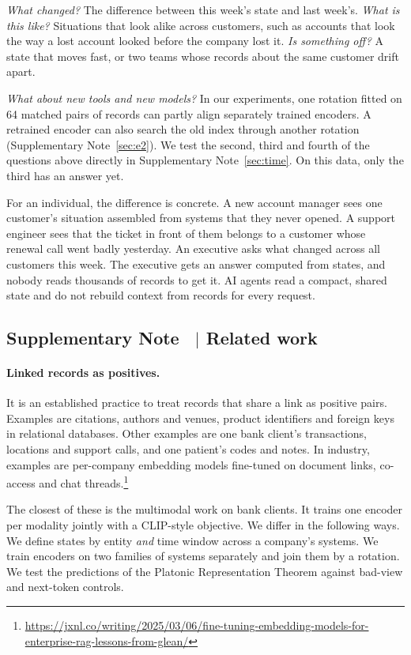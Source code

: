 \documentclass[11pt]{article}
\newcounter{suppnote}
\newcommand{\suppnote}[2]{\refstepcounter{suppnote}\label{#2}\subsection{Supplementary Note \thesuppnote\ $|$ #1}}
\begin{document}
\emph{What changed?} The difference between this week's state and last week's.
\emph{What is this like?} Situations that look alike across customers, such as accounts that look the way a lost account looked before the company lost it.
\emph{Is something off?} A state that moves fast, or two teams whose records about the same customer drift apart.

\emph{What about new tools and new models?} In our experiments, one rotation fitted on 64 matched pairs of records can partly align separately trained encoders. A retrained encoder can also search the old index through another rotation (Supplementary Note~\ref{sec:e2}).
We test the second, third and fourth of the questions above directly in Supplementary Note~\ref{sec:time}. On this data, only the third has an answer yet.

For an individual, the difference is concrete. A new account manager sees one customer's situation assembled from systems that they never opened. A support engineer sees that the ticket in front of them belongs to a customer whose renewal call went badly yesterday. An executive asks what changed across all customers this week. The executive gets an answer computed from states, and nobody reads thousands of records to get it. AI agents read a compact, shared state and do not rebuild context from records for every request.

\suppnote{Related work}{sec:related}
\paragraph{Linked records as positives.} It is an established practice to treat records that share a link as positive pairs. Examples are citations\citep{cohan2020specter}, authors and venues\citep{zhang2022metadata}, product identifiers\citep{peeters2022supervised} and foreign keys in relational databases\citep{peleska2025relational}. Other examples are one bank client's transactions, locations and support calls\citep{mollaev2025banking}, and one patient's codes and notes\citep{cai2024ehr}. In industry, examples are per-company embedding models fine-tuned on document links, co-access and chat threads.\footnote{\url{https://jxnl.co/writing/2025/03/06/fine-tuning-embedding-models-for-enterprise-rag-lessons-from-glean/}}

The closest of these is the multimodal work on bank clients. It trains one encoder per modality jointly with a CLIP-style objective\citep{radford2021clip}. We differ in the following ways. We define states by entity \emph{and} time window across a company's systems. We train encoders on two families of systems separately and join them by a rotation. We test the predictions of the Platonic Representation Theorem against bad-view and next-token controls.
\end{document}
